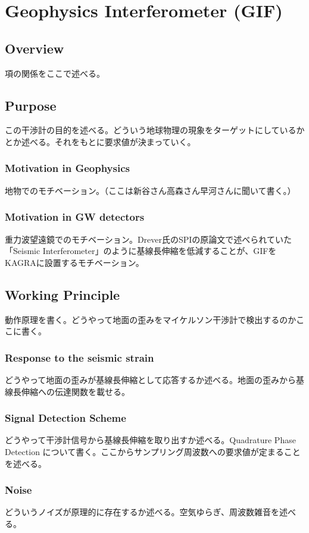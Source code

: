 \chapter{Geophysics Interferometer (GIF)}




\section{Overview} %
項の関係をここで述べる。




\section{Purpose} %
この干渉計の目的を述べる。どういう地球物理の現象をターゲットにしているかとか述べる。それをもとに要求値が決まっていく。
\subsection{Motivation in Geophysics}
地物でのモチベーション。（ここは新谷さん高森さん早河さんに聞いて書く。）
\subsection{Motivation in GW detectors}
重力波望遠鏡でのモチベーション。Drever氏のSPIの原論文で述べられていた「Seismic Interferometer」のように基線長伸縮を低減することが、GIFをKAGRAに設置するモチベーション。




\section{Working Principle} %
動作原理を書く。どうやって地面の歪みをマイケルソン干渉計で検出するのかここに書く。
\subsection{Response to the seismic strain}
どうやって地面の歪みが基線長伸縮として応答するか述べる。地面の歪みから基線長伸縮への伝達関数を載せる。
\subsection{Signal Detection Scheme}
どうやって干渉計信号から基線長伸縮を取り出すか述べる。Quadrature Phase Detection について書く。ここからサンプリング周波数への要求値が定まることを述べる。
\subsection{Noise}
どういうノイズが原理的に存在するか述べる。空気ゆらぎ、周波数雑音を述べる。




